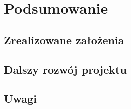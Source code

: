 \chapter{Podsumowanie}

\section{Zrealizowane założenia}
\section{Dalszy rozwój projektu}
\section{Uwagi}